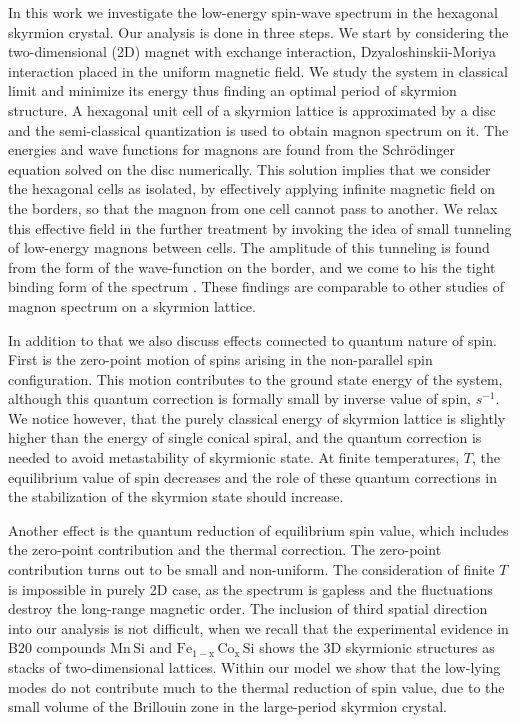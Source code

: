 \documentclass[aps,prb,twocolumn,superscriptaddress,nobalancelastpage]{revtex4-1}
\begin{document}
In this work we  investigate the low-energy spin-wave spectrum in the hexagonal skyrmion crystal.  Our analysis is done in three steps. We start by considering the two-dimensional (2D) magnet with exchange interaction, Dzyaloshinskii-Moriya interaction placed in the uniform magnetic field.  We study the system in classical limit and minimize its energy thus finding an optimal period of skyrmion structure.   A hexagonal unit cell of a skyrmion lattice is approximated by a disc  and  the semi-classical quantization is used to obtain magnon spectrum on it.  The energies and wave functions for magnons are found from the  Schr\"{o}dinger equation solved on the disc numerically.  This solution implies that we consider the hexagonal cells as isolated, by effectively applying infinite magnetic field on the borders, so that the magnon from one cell cannot pass to another. We relax this effective field in the further treatment by invoking the idea of small tunneling of low-energy magnons between cells. The amplitude of this tunneling is found from the form of the wave-function on the border, and we come to his the tight binding form of the spectrum \cite{book:abrikosov}. These findings are comparable to other studies of magnon spectrum on a skyrmion lattice. \cite{Mochizuki2012}

In addition to that we also discuss  effects connected to quantum nature of spin. First is the  zero-point motion of spins arising in the non-parallel spin configuration. This motion contributes to the ground state energy of the system, although this quantum correction is formally small by inverse value of spin, $s^{-1}$. We notice however, that the purely classical energy of skyrmion lattice is slightly higher than the energy of single conical spiral, and the quantum correction is needed to avoid metastability of skyrmionic state. 
At finite temperatures, $T$, the equilibrium value of spin decreases and the role of these quantum corrections in the stabilization of the skyrmion state should increase. 

Another effect is the quantum reduction of equilibrium spin value, which includes the zero-point contribution and the thermal correction. The zero-point contribution turns out to be small and non-uniform.
The consideration of finite $T$ is impossible in purely 2D case, as the spectrum is gapless and the fluctuations destroy the long-range magnetic order.  The inclusion of third spatial direction into our analysis is not difficult,  when we recall that the experimental evidence in B20 compounds   $\mathrm{Mn\,Si}$ and $\mathrm{Fe_{1-x} \,Co_x\, Si}$ shows the 3D skyrmionic structures  as stacks of two-dimensional lattices.  Within our model we show that the low-lying modes do not contribute much to the  thermal reduction of spin value, due to the small  volume of the Brillouin zone in the large-period skyrmion crystal. 
\end{document}
